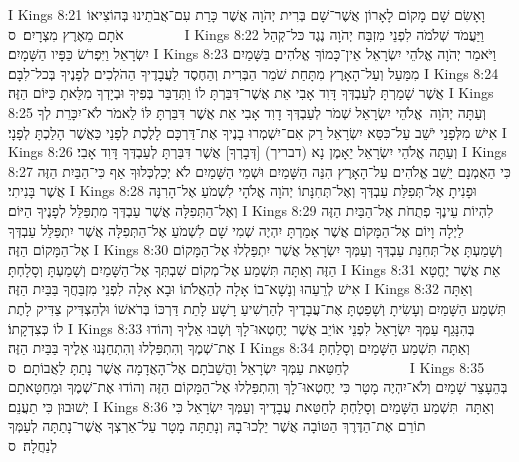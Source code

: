 I Kings 8:21	וָאָשִׂם שָׁם מָקוֹם לָאָרוֹן אֲשֶׁר־שָׁם בְּרִית יְהֹוָה אֲשֶׁר כָּרַת עִם־אֲבֹתֵינוּ בְּהוֹצִיאוֹ אֹתָם מֵאֶרֶץ מִצְרָיִם׃ {ס}        
I Kings 8:22	וַיַּעֲמֹד שְׁלֹמֹה לִפְנֵי מִזְבַּח יְהֹוָה נֶגֶד כּל־קְהַל יִשְׂרָאֵל וַיִּפְרֹשׂ כַּפָּיו הַשָּׁמָיִם׃
I Kings 8:23	וַיֹּאמַר יְהֹוָה אֱלֹהֵי יִשְׂרָאֵל אֵין־כָּמוֹךָ אֱלֹהִים בַּשָּׁמַיִם מִמַּעַל וְעַל־הָאָרֶץ מִתָּחַת שֹׁמֵר הַבְּרִית וְהַחֶסֶד לַעֲבָדֶיךָ הַהֹלְכִים לְפָנֶיךָ בְּכל־לִבָּם׃
I Kings 8:24	אֲשֶׁר שָׁמַרְתָּ לְעַבְדְּךָ דָּוִד אָבִי אֵת אֲשֶׁר־דִּבַּרְתָּ לוֹ וַתְּדַבֵּר בְּפִיךָ וּבְיָדְךָ מִלֵּאתָ כַּיּוֹם הַזֶּה׃
I Kings 8:25	וְעַתָּה יְהֹוָה  אֱלֹהֵי יִשְׂרָאֵל שְׁמֹר לְעַבְדְּךָ דָוִד אָבִי אֵת אֲשֶׁר דִּבַּרְתָּ לּוֹ לֵאמֹר לֹא־יִכָּרֵת לְךָ אִישׁ מִלְּפָנַי יֹשֵׁב עַל־כִּסֵּא יִשְׂרָאֵל רַק אִם־יִשְׁמְרוּ בָנֶיךָ אֶת־דַּרְכָּם לָלֶכֶת לְפָנַי כַּאֲשֶׁר הָלַכְתָּ לְפָנָי׃
I Kings 8:26	וְעַתָּה אֱלֹהֵי יִשְׂרָאֵל יֵאָמֶן נָא (דבריך) [דְּבָרְךָ] אֲשֶׁר דִּבַּרְתָּ לְעַבְדְּךָ דָּוִד אָבִי׃
I Kings 8:27	כִּי הַאֻמְנָם יֵשֵׁב אֱלֹהִים עַל־הָאָרֶץ הִנֵּה הַשָּׁמַיִם וּשְׁמֵי הַשָּׁמַיִם לֹא יְכַלְכְּלוּךָ אַף כִּי־הַבַּיִת הַזֶּה אֲשֶׁר בָּנִיתִי׃
I Kings 8:28	וּפָנִיתָ אֶל־תְּפִלַּת עַבְדְּךָ וְאֶל־תְּחִנָּתוֹ יְהֹוָה אֱלֹהָי לִשְׁמֹעַ אֶל־הָרִנָּה וְאֶל־הַתְּפִלָּה אֲשֶׁר עַבְדְּךָ מִתְפַּלֵּל לְפָנֶיךָ הַיּוֹם׃
I Kings 8:29	לִהְיוֹת עֵינֶךָ פְתֻחֹת אֶל־הַבַּיִת הַזֶּה לַיְלָה וָיוֹם אֶל־הַמָּקוֹם אֲשֶׁר אָמַרְתָּ יִהְיֶה שְׁמִי שָׁם לִשְׁמֹעַ אֶל־הַתְּפִלָּה אֲשֶׁר יִתְפַּלֵּל עַבְדְּךָ אֶל־הַמָּקוֹם הַזֶּה׃
I Kings 8:30	וְשָׁמַעְתָּ אֶל־תְּחִנַּת עַבְדְּךָ וְעַמְּךָ יִשְׂרָאֵל אֲשֶׁר יִתְפַּלְלוּ אֶל־הַמָּקוֹם הַזֶּה וְאַתָּה תִּשְׁמַע אֶל־מְקוֹם שִׁבְתְּךָ אֶל־הַשָּׁמַיִם וְשָׁמַעְתָּ וְסָלָחְתָּ׃
I Kings 8:31	אֵת אֲשֶׁר יֶחֱטָא אִישׁ לְרֵעֵהוּ וְנָשָׁא־בוֹ אָלָה לְהַאֲלֹתוֹ וּבָא אָלָה לִפְנֵי מִזְבַּחֲךָ בַּבַּיִת הַזֶּה׃
I Kings 8:32	וְאַתָּה  תִּשְׁמַע הַשָּׁמַיִם וְעָשִׂיתָ וְשָׁפַטְתָּ אֶת־עֲבָדֶיךָ לְהַרְשִׁיעַ רָשָׁע לָתֵת דַּרְכּוֹ בְּרֹאשׁוֹ וּלְהַצְדִּיק צַדִּיק לָתֶת לוֹ כְּצִדְקָתוֹ׃
I Kings 8:33	בְּהִנָּגֵף עַמְּךָ יִשְׂרָאֵל לִפְנֵי אוֹיֵב אֲשֶׁר יֶחֶטְאוּ־לָךְ וְשָׁבוּ אֵלֶיךָ וְהוֹדוּ אֶת־שְׁמֶךָ וְהִתְפַּלְלוּ וְהִתְחַנְּנוּ אֵלֶיךָ בַּבַּיִת הַזֶּה׃
I Kings 8:34	וְאַתָּה תִּשְׁמַע הַשָּׁמַיִם וְסָלַחְתָּ לְחַטַּאת עַמְּךָ יִשְׂרָאֵל וַהֲשֵׁבֹתָם אֶל־הָאֲדָמָה אֲשֶׁר נָתַתָּ לַאֲבוֹתָם׃ {ס}        
I Kings 8:35	בְּהֵעָצֵר שָׁמַיִם וְלֹא־יִהְיֶה מָטָר כִּי יֶחֶטְאוּ־לָךְ וְהִתְפַּלְלוּ אֶל־הַמָּקוֹם הַזֶּה וְהוֹדוּ אֶת־שְׁמֶךָ וּמֵחַטָּאתָם יְשׁוּבוּן כִּי תַעֲנֵם׃
I Kings 8:36	וְאַתָּה  תִּשְׁמַע הַשָּׁמַיִם וְסָלַחְתָּ לְחַטַּאת עֲבָדֶיךָ וְעַמְּךָ יִשְׂרָאֵל כִּי תוֹרֵם אֶת־הַדֶּרֶךְ הַטּוֹבָה אֲשֶׁר יֵלְכוּ־בָהּ וְנָתַתָּה מָטָר עַל־אַרְצְךָ אֲשֶׁר־נָתַתָּה לְעַמְּךָ לְנַחֲלָה׃ {ס}        
